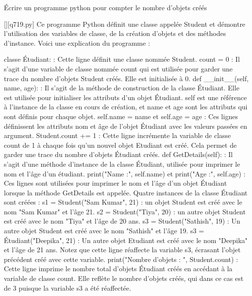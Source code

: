         \question
        Écrire un programme python pour compter le nombre d'objets créés
        \par
        \begin{solution}
            \renewcommand{\nomfichier}{q719.py}
            \pythonfile{\chemincode \nomfichier}[][\nomfichier]
            Ce programme Python définit une classe appelée Student et démontre l'utilisation des variables de classe, de la création d'objets et des méthodes d'instance. Voici une explication du programme :

    classe Étudiant: : Cette ligne définit une classe nommée Student.
    count = 0 : Il s'agit d'une variable de classe nommée count qui est utilisée pour garder une trace du nombre d'objets Student créés. Elle est initialisée à 0.
    def __init__(self, name, age): : Il s'agit de la méthode de construction de la classe Étudiant. Elle est utilisée pour initialiser les attributs d'un objet Étudiant. self est une référence à l'instance de la classe en cours de création, et name et age sont les attributs qui sont définis pour chaque objet.
    self.name = name et self.age = age : Ces lignes définissent les attributs nom et âge de l'objet Étudiant avec les valeurs passées en argument.
    Student.count += 1 : Cette ligne incrémente la variable de classe count de 1 à chaque fois qu'un nouvel objet Etudiant est créé. Cela permet de garder une trace du nombre d'objets Étudiant créés.
    def GetDetails(self): : Il s'agit d'une méthode d'instance de la classe Étudiant, utilisée pour imprimer le nom et l'âge d'un étudiant.
    print("Name :", self.name) et print("Age :", self.age) : Ces lignes sont utilisées pour imprimer le nom et l'âge d'un objet Étudiant lorsque la méthode GetDetails est appelée.
    Quatre instances de la classe Étudiant sont créées :
        s1 = Student("Sam Kumar", 21) : un objet Student est créé avec le nom "Sam Kumar" et l'âge 21.
        s2 = Student("Tiya", 20) : un autre objet Student est créé avec le nom "Tiya" et l'âge de 20 ans.
        s3 = Student("Sathish", 19) : Un autre objet Student est créé avec le nom "Sathish" et l'âge 19.
        s3 = Étudiant("Deepika", 21) : Un autre objet Etudiant est créé avec le nom "Deepika" et l'âge de 21 ans. Notez que cette ligne réaffecte la variable s3, écrasant l'objet précédent créé avec cette variable.
    print("Nombre d'objets : ", Student.count) : Cette ligne imprime le nombre total d'objets Étudiant créés en accédant à la variable de classe count. Elle reflète le nombre d'objets créés, qui dans ce cas est de 3 puisque la variable s3 a été réaffectée.
        \end{solution}
        

